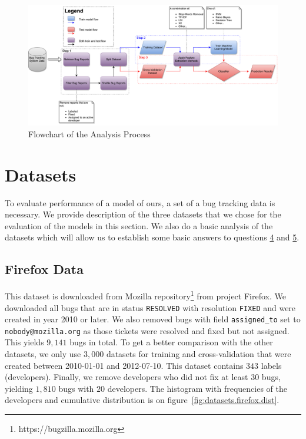 \begin{landscape}
\begin{figure}[htbp]
    \centering
        \includegraphics[width=550px]{./images/flowchart/analysis_flowchart.pdf}
    \caption{Flowchart of the Analysis Process}
    \label{fig:model.flowchart}
\end{figure}
\end{landscape}

\section{Datasets}
\label{section:datasets}

To evaluate performance of a model of ours, a set of a bug tracking data is necessary. We provide description of the three datasets that we chose for the evaluation of the models in this section. We also do a basic analysis of the datasets which will allow us to establish some basic answers to questions \hyperlink{question:4}{4} and \hyperlink{question:5}{5}.

\subsection{Firefox Data}

This dataset is downloaded from Mozilla repository\footnote{https://bugzilla.mozilla.org} from project Firefox. We downloaded all bugs that are in status \texttt{RESOLVED} with resolution \texttt{FIXED} and were created in year 2010 or later. We also removed bugs with field \texttt{assigned\_to} set to \texttt{nobody@mozilla.org} as those tickets were resolved and fixed but not assigned. This yields $9,141$ bugs in total. To get a better comparison with the other datasets, we only use $3,000$ datasets for training and cross-validation that were created between 2010-01-01 and 2012-07-10. This dataset contains $343$ labels (developers). Finally, we remove developers who did not fix at least $30$ bugs, yielding $1,810$ bugs with $20$ developers. The histogram with frequencies of the developers and cumulative distribution is on figure~\ref{fig:datasets.firefox.dist}.

